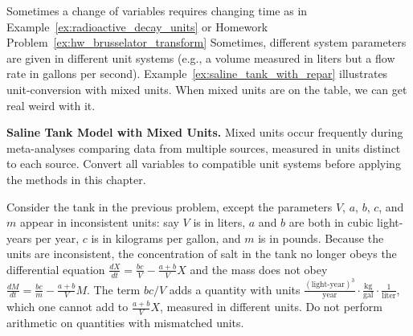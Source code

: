 Sometimes a change of variables requires changing time as in Example~\ref{ex:radioactive_decay_units} or Homework Problem~\ref{ex:hw_brusselator_transform}
Sometimes, different system parameters are given in different unit systems (e.g., a volume measured in liters but a flow rate in gallons per second).
Example~\ref{ex:saline_tank_with_repar} illustrates unit-conversion with mixed units.
When mixed units are on the table, we can get real weird with it.



\begin{example}\label{ex:saline_tank_with_repar}
\textbf{Saline Tank Model with Mixed Units.}
Mixed units occur frequently during meta-analyses comparing data from multiple sources, measured in units distinct to each source. Convert all variables to compatible unit systems before applying the methods in this chapter.

Consider the tank in the previous problem, except the parameters $V$, $a$, $b$, $c$, and $m$ appear in inconsistent units: say $V$ is in liters, $a$ and $b$ are both in cubic light-years per year, $c$ is in kilograms per gallon, and $m$ is in pounds. Because the units are inconsistent, the concentration of salt in the tank no longer obeys the differential equation $\frac{dX}{dt} = \frac{bc}{V} - \frac{a+b}{V}X$ and the mass does not obey $\frac{dM}{dt} = \frac{bc}{m} - \frac{a+b}{V}M$. The term $bc/V$ adds a quantity with units $\frac{(\text{light-year})^3}{\text{year}} \cdot \frac{\text{kg}}{\text{gal}} \cdot \frac{1}{\text{liter}}$, which one cannot add to $\frac{a+b}{V}X$, measured in different units. Do not perform arithmetic on quantities with mismatched units.



\end{example}
